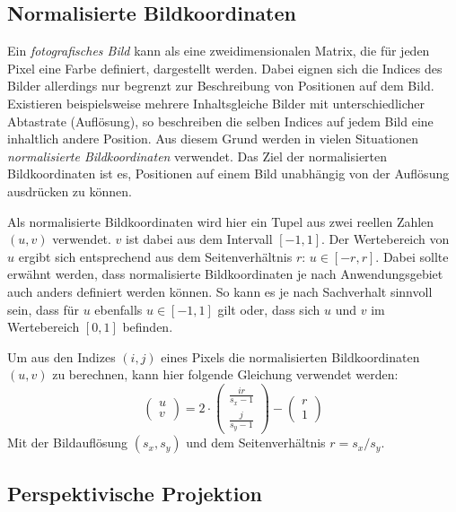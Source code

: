\documentclass[ngerman,a4paper,parskip=half]{scrartcl}
\begin{document}
\subsection{Normalisierte Bildkoordinaten}
\label{sec:imagecoordinates}

Ein \emph{fotografisches Bild} kann als eine zweidimensionalen Matrix, die für jeden Pixel eine Farbe definiert, dargestellt werden. Dabei eignen sich die Indices des Bilder allerdings nur begrenzt zur Beschreibung von Positionen auf dem Bild. Existieren beispielsweise mehrere Inhaltsgleiche Bilder mit unterschiedlicher Abtastrate (Auflösung), so beschreiben die selben Indices auf jedem Bild eine inhaltlich andere Position. Aus diesem Grund werden in vielen Situationen \emph{normalisierte Bildkoordinaten} verwendet. Das Ziel der normalisierten Bildkoordinaten ist es, Positionen auf einem Bild unabhängig von der Auflösung ausdrücken zu können.

Als normalisierte Bildkoordinaten wird hier ein Tupel aus zwei reellen Zahlen $(u,v)$ verwendet. $v$ ist dabei aus dem Intervall $[-1,1]$. Der Wertebereich von $u$ ergibt sich entsprechend aus dem Seitenverhältnis $r$: $u \in [-r,r]$. Dabei sollte erwähnt werden, dass normalisierte Bildkoordinaten je nach Anwendungsgebiet auch anders definiert werden können. So kann es je nach Sachverhalt sinnvoll sein, dass für $u$ ebenfalls $u \in [-1,1]$ gilt oder, dass sich $u$ und $v$ im Wertebereich $[0,1]$ befinden.

Um aus den Indizes $(i,j)$ eines Pixels die normalisierten Bildkoordinaten $(u,v)$ zu berechnen, kann hier folgende Gleichung verwendet werden:
\[ \begin{pmatrix}
u \\ v
\end{pmatrix} = 2 \cdot \begin{pmatrix}
\frac{i r}{s_x - 1} \\
\frac{j}{s_y - 1}
\end{pmatrix} - \begin{pmatrix}
r \\ 1
\end{pmatrix} \]
Mit der Bildauflösung $(s_x, s_y)$ und dem Seitenverhältnis $r = s_x/s_y$.

\subsection{Perspektivische Projektion}
\label{sec:perspective}
\end{document}
